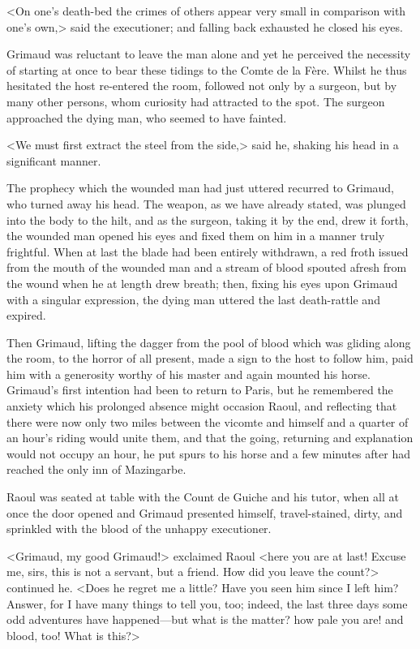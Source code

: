 <On one's death-bed the crimes of others appear very small in comparison with one's own,> said the executioner; and falling back exhausted he closed his eyes.

Grimaud was reluctant to leave the man alone and yet he perceived the necessity of starting at once to bear these tidings to the Comte de la Fère. Whilst he thus hesitated the host re-entered the room, followed not only by a surgeon, but by many other persons, whom curiosity had attracted to the spot. The surgeon approached the dying man, who seemed to have fainted.

<We must first extract the steel from the side,> said he, shaking his head in a significant manner.

The prophecy which the wounded man had just uttered recurred to Grimaud, who turned away his head. The weapon, as we have already stated, was plunged into the body to the hilt, and as the surgeon, taking it by the end, drew it forth, the wounded man opened his eyes and fixed them on him in a manner truly frightful. When at last the blade had been entirely withdrawn, a red froth issued from the mouth of the wounded man and a stream of blood spouted afresh from the wound when he at length drew breath; then, fixing his eyes upon Grimaud with a singular expression, the dying man uttered the last death-rattle and expired.

Then Grimaud, lifting the dagger from the pool of blood which was gliding along the room, to the horror of all present, made a sign to the host to follow him, paid him with a generosity worthy of his master and again mounted his horse. Grimaud's first intention had been to return to Paris, but he remembered the anxiety which his prolonged absence might occasion Raoul, and reflecting that there were now only two miles between the vicomte and himself and a quarter of an hour's riding would unite them, and that the going, returning and explanation would not occupy an hour, he put spurs to his horse and a few minutes after had reached the only inn of Mazingarbe.

Raoul was seated at table with the Count de Guiche and his tutor, when all at once the door opened and Grimaud presented himself, travel-stained, dirty, and sprinkled with the blood of the unhappy executioner.

<Grimaud, my good Grimaud!> exclaimed Raoul <here you are at last! Excuse me, sirs, this is not a servant, but a friend. How did you leave the count?> continued he. <Does he regret me a little? Have you seen him since I left him? Answer, for I have many things to tell you, too; indeed, the last three days some odd adventures have happened—but what is the matter? how pale you are! and blood, too! What is this?>

